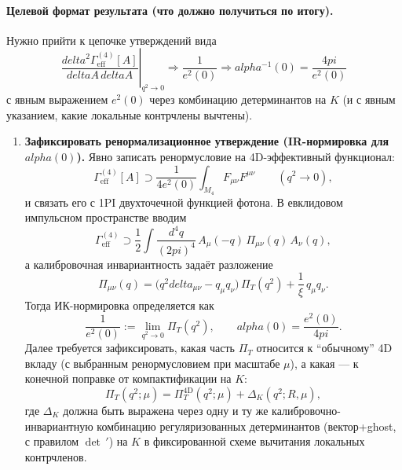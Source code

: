 \documentclass[12pt]{article}
\def\alpha{alpha}%
\def\pi{pi}%
\def\delta{delta}%
\begin{document}
\paragraph{Целевой формат результата (что должно получиться по итогу).}
Нужно прийти к цепочке утверждений вида
\begin{equation}
\left.\frac{\delta^2\Gamma_{\mathrm{eff}}^{(4)}[A]}{\delta A\,\delta A}\right|_{q^2\to 0}
\Longrightarrow
\frac{1}{e^2(0)}
\Longrightarrow
\alpha^{-1}(0)=\frac{4\pi}{e^2(0)}
\end{equation}
с явным выражением $e^2(0)$ через комбинацию детерминантов на $K$ (и с явным указанием, какие локальные контрчлены вычтены).

\begin{enumerate}
  \item \textbf{Зафиксировать ренормализационное утверждение (IR-нормировка для $\alpha(0)$).}
  Явно записать ренормусловие на 4D-эффективный функционал:
  \begin{equation}\label{eq:renorm_condition_alpha0}
    \Gamma_{\mathrm{eff}}^{(4)}[A]
    \supset
    \frac{1}{4e^2(0)}\int_{M_4} F_{\mu\nu}F^{\mu\nu}
    \qquad (q^2\to 0),
  \end{equation}
  и связать его с 1PI двухточечной функцией фотона. В евклидовом импульсном пространстве вводим
  \begin{equation}\label{eq:gamma2_def}
    \Gamma_{\mathrm{eff}}^{(4)}\supset
    \frac{1}{2}\int\!\frac{d^4q}{(2\pi)^4}\,A_\mu(-q)\,\Pi_{\mu\nu}(q)\,A_\nu(q),
  \end{equation}
  а калибровочная инвариантность задаёт разложение
  \begin{equation}\label{eq:Pi_decomp}
    \Pi_{\mu\nu}(q)=\bigl(q^2\delta_{\mu\nu}-q_\mu q_\nu\bigr)\,\Pi_T(q^2)+\frac{1}{\xi}\,q_\mu q_\nu.
  \end{equation}
  Тогда ИК-нормировка определяется как
  \begin{equation}\label{eq:e0_from_Pi}
    \frac{1}{e^2(0)}:=\lim_{q^2\to 0}\Pi_T(q^2),
    \qquad
    \alpha(0)=\frac{e^2(0)}{4\pi}.
  \end{equation}
  Далее требуется зафиксировать, какая часть $\Pi_T$ относится к ``обычному'' 4D вкладу (с выбранным ренормусловием при масштабе $\mu$), а какая --- к конечной поправке от компактификации на $K$:
  \begin{equation}\label{eq:Pi_split}
    \Pi_T(q^2;\mu)=\Pi_T^{\mathrm{4D}}(q^2;\mu)+\Delta_K(q^2;R,\mu),
  \end{equation}
  где $\Delta_K$ должна быть выражена через одну и ту же калибровочно-инвариантную комбинацию регуляризованных детерминантов (вектор+ghost, с правилом $\det\,'$) на $K$ в фиксированной схеме вычитания локальных контрчленов.
  

\end{enumerate}
\end{document}
